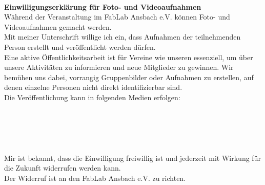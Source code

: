 \begin{Form}
\hfill
{} \\

\end{Form}

\newpage
\begin{Form}
\renewcommand{\baselinestretch}{1.35}\selectfont
\setlength{\parskip}{0.6ex}

{\Large\textbf{Einwilligungserklärung für Foto- und Videoaufnahmen}} \\

Während der Veranstaltung im FabLab Ansbach e.V. können Foto- und Videoaufnahmen gemacht werden. \\
Mit meiner Unterschrift willige ich ein, dass Aufnahmen der teilnehmenden Person erstellt und veröffentlicht werden dürfen. \\

Eine aktive Öffentlichkeitsarbeit ist für Vereine wie unseren essenziell, um über unsere Aktivitäten zu informieren und neue Mitglieder zu gewinnen. Wir bemühen uns dabei, vorrangig Gruppenbilder oder Aufnahmen zu erstellen, auf denen einzelne Personen nicht direkt identifizierbar sind. \\

Die Veröffentlichung kann in folgenden Medien erfolgen: \\
 \\
 \\
 \\
 \\

 \\

Mir ist bekannt, dass die Einwilligung freiwillig ist und jederzeit mit Wirkung für die Zukunft widerrufen werden kann. \\
Der Widerruf ist an den FabLab Ansbach e.V. zu richten. \\

\hfill
{} \\

\hfill
{} \\

\end{Form}




